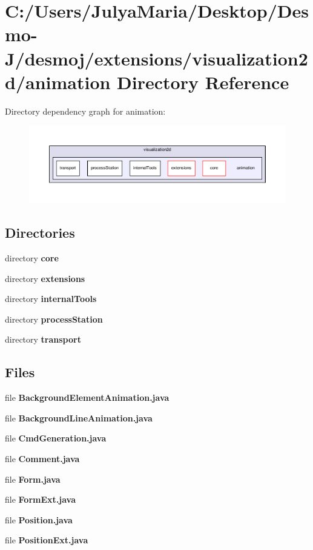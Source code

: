 \section{C\-:/\-Users/\-Julya\-Maria/\-Desktop/\-Desmo-\/\-J/desmoj/extensions/visualization2d/animation Directory Reference}
\label{dir_674febedb19e60e6e0eed8ec56637269}
Directory dependency graph for animation\-:
\nopagebreak
\begin{figure}[H]
\begin{center}
\leavevmode
\includegraphics[width=350pt]{dir_674febedb19e60e6e0eed8ec56637269_dep}
\end{center}
\end{figure}
\subsection*{Directories}
\begin{DoxyCompactItemize}
\item 
directory {\bf core}
\item 
directory {\bf extensions}
\item 
directory {\bf internal\-Tools}
\item 
directory {\bf process\-Station}
\item 
directory {\bf transport}
\end{DoxyCompactItemize}
\subsection*{Files}
\begin{DoxyCompactItemize}
\item 
file {\bfseries Background\-Element\-Animation.\-java}
\item 
file {\bfseries Background\-Line\-Animation.\-java}
\item 
file {\bfseries Cmd\-Generation.\-java}
\item 
file {\bfseries Comment.\-java}
\item 
file {\bfseries Form.\-java}
\item 
file {\bfseries Form\-Ext.\-java}
\item 
file {\bfseries Position.\-java}
\item 
file {\bfseries Position\-Ext.\-java}
\end{DoxyCompactItemize}
